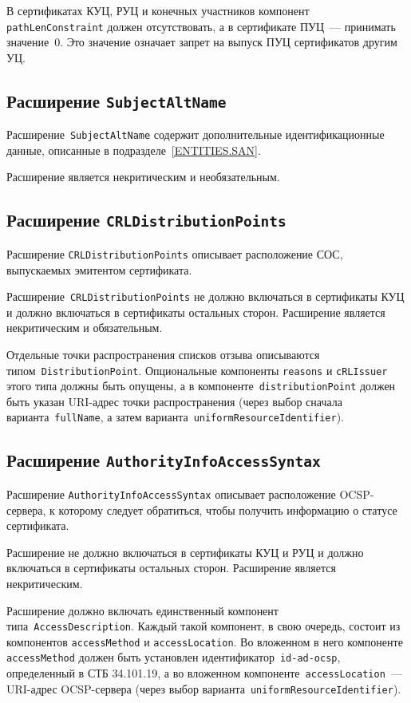В сертификатах КУЦ, РУЦ и конечных участников компонент 
\texttt{pathLenConstraint} должен отсутствовать,
а в сертификате ПУЦ~--- принимать значение~0. 
Это значение означает запрет на выпуск ПУЦ сертификатов 
другим УЦ. 

\subsection{Расширение \texttt{SubjectAltName}}

Расширение~\texttt{SubjectAltName} содержит дополнительные 
идентификационные данные, описанные в подразделе~\ref{ENTITIES.SAN}. 

Расширение является некритическим и необязательным.

\subsection{Расширение \texttt{CRLDistributionPoints}}

Расширение \texttt{CRLDistributionPoints} описывает расположение СОС, 
выпускаемых эмитентом сертификата. 

Расширение~\texttt{CRLDistributionPoints} 
не должно включаться в сертификаты КУЦ и должно включаться в
сертификаты остальных сторон. Расширение является некритическим и обязательным.

Отдельные точки распространения списков отзыва описываются 
типом~\texttt{DistributionPoint}. Опциональные компоненты \texttt{reasons} 
и \texttt{cRLIssuer} этого типа должны быть опущены, а в 
компоненте~\texttt{distributionPoint} должен быть указан 
URI-адрес точки распространения (через выбор сначала 
варианта~\texttt{fullName}, а затем 
варианта~\texttt{uniformResourceIdentifier}). 

\subsection{Расширение \texttt{AuthorityInfoAccessSyntax}}

Расширение \texttt{AuthorityInfoAccessSyntax} описывает расположение 
OCSP-сервера, к которому следует обратиться, чтобы получить информацию о 
статусе сертификата.

Расширение не должно включаться в сертификаты КУЦ и РУЦ и должно 
включаться в сертификаты остальных сторон. Расширение является 
некритическим. 

Расширение должно включать единственный компонент 
типа~\texttt{AccessDescription}. Каждый такой компонент, в свою очередь, 
состоит из компонентов \texttt{accessMethod} и \texttt{accessLocation}. 
%
Во вложенном в него компоненте \texttt{accessMethod} должен быть установлен 
идентификатор~\verb|id-ad-ocsp|, определенный в СТБ 34.101.19,
%
а во вложенном компоненте~\texttt{accessLocation}~--- URI-адрес OCSP-сервера
(через выбор варианта~\texttt{uniformResourceIdentifier}).

